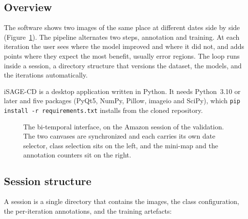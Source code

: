 
\subsection{Overview}
\label{sec:overview}

The software shows two images of the same place at different dates
side by side (Figure~\ref{fig:overview}). The pipeline alternates
two steps, annotation and training. At each iteration the user sees
where the model improved and where it did not, and adds points
where they expect the most benefit, usually error regions. The loop
runs inside a session, a directory structure that versions the
dataset, the models, and the iterations automatically.

iSAGE-CD is a desktop application written in Python. It needs
Python~3.10 or later and five packages (PyQt5, NumPy, Pillow,
imageio and SciPy), which \texttt{pip install -r requirements.txt}
installs from the cloned repository.

\begin{figure}[htbp]
  \centering
  
  \caption{The bi-temporal interface, on the Amazon session of the
    validation. The two canvases are synchronized and each carries
    its own date selector, class selection sits on the left, and
    the mini-map and the annotation counters sit on the right.}
  \label{fig:overview}
\end{figure}

\subsection{Session structure}
\label{sec:session_structure}

A session is a single directory that contains the images, the class
configuration, the per-iteration annotations, and the training
artefacts:

